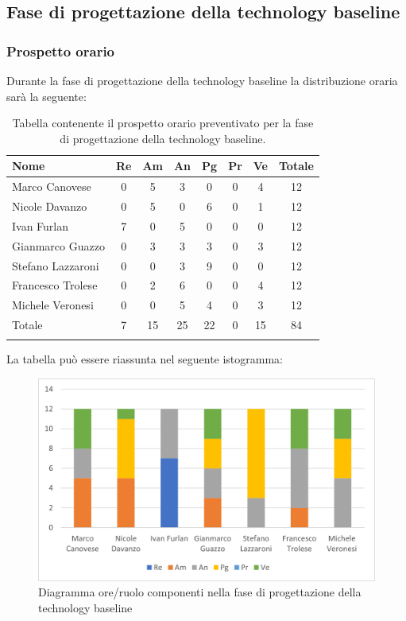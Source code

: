 			\subsection{Fase di progettazione della technology baseline}
            \subsubsection{Prospetto orario}
			Durante la fase di progettazione della technology baseline la distribuzione oraria sarà la seguente:
			
			\begin{longtable}{|l|c|c|c|c|c|c|c|}
				\hline
				\rowcolor{lighter-grayer}
				\textbf{Nome} & \textbf{Re} & \textbf{Am} & \textbf{An} & \textbf{Pg}  & \textbf{Pr}   & \textbf{Ve} & \textbf{Totale} \\
				\hline
				\endfirsthead
				
				\hline
				Marco Canovese & 0 & 5 & 3 & 0 & 0 & 4 & 12\\
				\hline
				\hline
				Nicole Davanzo & 0 & 5 & 0 & 6 & 0 & 1 & 12\\
				\hline
				\hline
				Ivan Furlan & 7 & 0 & 5 & 0 & 0 & 0 & 12\\
				\hline
				\hline
				Gianmarco Guazzo & 0 & 3 & 3 & 3 & 0 & 3 & 12\\
				\hline
				\hline
				Stefano Lazzaroni & 0 & 0 & 3 & 9 & 0 & 0 & 12\\
				\hline
				\hline
				Francesco Trolese & 0 & 2 & 6 & 0 & 0 & 4 & 12\\
				\hline
				\hline
				Michele Veronesi & 0 & 0 & 5 & 4 & 0 & 3 & 12\\
				\hline 
				\hline
				Totale & 7 & 15 & 25 & 22 & 0 & 15 & 84\\
				\hline 
				\rowcolor{white}
				\caption{Tabella contenente il prospetto orario preventivato per la fase di progettazione della technology baseline.}
			\end{longtable}

		
			La tabella può essere riassunta nel seguente istogramma:
		
			\begin{figure}[H]
				\centering
				\includegraphics[width=0.8\linewidth]{res/images/preventivo/3-1.png}
				\caption{Diagramma ore/ruolo componenti nella fase di progettazione della technology baseline }
				\label{fig:diagramma suddivisione ruoli fase progettazione della technology baseline}
			\end{figure}
		
